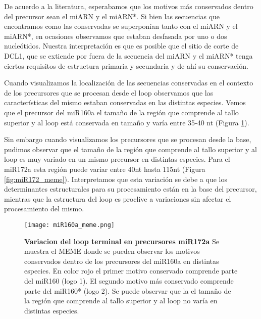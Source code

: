 De acuerdo a la literatura, esperabamos que los motivos más conservados dentro del precursor sean el miARN y el miARN*.
Si bien las secuencias que encontramos como las conservadas se superponían tanto con el miARN y el miARN*, en ocasiones observamos que estaban desfasada por uno o dos nucleótidos.
Nuestra interpretación es que es posible que el sitio de corte de DCL1, que se extiende por fuera de la secuencia del miARN y el miARN* tenga ciertos requisitos de estructura primaria y secundaria y de ahí su conservación.

Cuando visualizamos la localización de las secuencias conservadas en el contexto de los precursores que se procesan desde el loop observamos que las características del mismo estaban conservadas en las distintas especies.
Vemos que el precursor del miR160a el tamaño de la región que comprende al tallo superior y al loop está conservada en tamaño y varía entre 35-40 nt (Figura \ref{fig:miR160a_meme}).

Sin embargo cuando visualizamos los precursores que se procesan desde la base, pudimos observar que el tamaño de la región que comprende al tallo superior y al loop es muy variado en un mismo precursor en distintas especies.
Para el miR172a esta región puede variar entre 40nt hasta 115nt (Figura \ref{fig:miR172_meme}). 
Interpretamos que esta variación se debe a que los determinantes estructurales para su procesamiento están en la base del precursor, mientras que la estructura del loop es proclive a variaciones sin afectar el procesamiento del mismo.


\begin{landscape}
    \begin{figure}[htbp!] 
        \centering    
        \texttt{[image: miR160a\_meme.png]}
        \caption[Variacion del loop terminal en precursores miR172a]{
			\textbf{Variacion del loop terminal en precursores miR172a}
        Se muestra el MEME donde se pueden observar los motivos conservados dentro de los precursores del miR160a en distintas especies.
        En color rojo el primer motivo conservado comprende parte del miR160 (logo 1).
        El segundo motivo más conservado comprende parte del miR160* (logo 2).
        Se puede observar que la el tamaño de la región que comprende al tallo superior y al loop no varía en distintas especies.
        }
        \label{fig:miR160a_meme}
    \end{figure}
\end{landscape}

